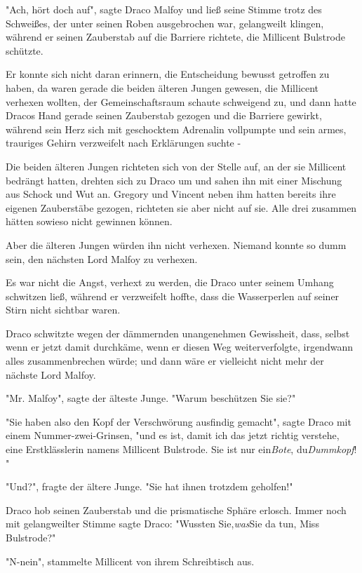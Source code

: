 {"Ach, hört doch auf", sagte Draco Malfoy und ließ seine Stimme trotz des Schweißes, der unter seinen Roben ausgebrochen war, gelangweilt klingen, während er seinen Zauberstab auf die Barriere richtete, die Millicent Bulstrode schützte.

Er konnte sich nicht daran erinnern, die Entscheidung bewusst getroffen zu haben, da waren gerade die beiden älteren Jungen gewesen, die Millicent verhexen wollten, der Gemeinschaftsraum schaute schweigend zu, und dann hatte Dracos Hand gerade seinen Zauberstab gezogen und die Barriere gewirkt, während sein Herz sich mit geschocktem Adrenalin vollpumpte und sein armes, trauriges Gehirn verzweifelt nach Erklärungen suchte -

Die beiden älteren Jungen richteten sich von der Stelle auf, an der sie Millicent bedrängt hatten, drehten sich zu Draco um und sahen ihn mit einer Mischung aus Schock und Wut an. Gregory und Vincent neben ihm hatten bereits ihre eigenen Zauberstäbe gezogen, richteten sie aber nicht auf sie. Alle drei zusammen hätten sowieso nicht gewinnen können.

Aber die älteren Jungen würden ihn nicht verhexen. Niemand konnte so dumm sein, den nächsten Lord Malfoy zu verhexen.

Es war nicht die Angst, verhext zu werden, die Draco unter seinem Umhang schwitzen ließ, während er verzweifelt hoffte, dass die Wasserperlen auf seiner Stirn nicht sichtbar waren.

Draco schwitzte wegen der dämmernden unangenehmen Gewissheit, dass, selbst wenn er jetzt damit durchkäme, wenn er diesen Weg weiterverfolgte, irgendwann alles zusammenbrechen würde; und dann wäre er vielleicht nicht mehr der nächste Lord Malfoy.

"Mr. Malfoy", sagte der älteste Junge. "Warum beschützen Sie sie?"

"Sie haben also den Kopf der Verschwörung ausfindig gemacht", sagte Draco mit einem Nummer-zwei-Grinsen, "und es ist, damit ich das jetzt richtig verstehe, eine Erstklässlerin namens Millicent Bulstrode. Sie ist nur ein\emph{Bote}, du\emph{Dummkopf}! "

"Und?", fragte der ältere Junge. "Sie hat ihnen trotzdem geholfen!"

Draco hob seinen Zauberstab und die prismatische Sphäre erlosch. Immer noch mit gelangweilter Stimme sagte Draco: "Wussten Sie,\emph{was}Sie da tun, Miss Bulstrode?"

"N-nein", stammelte Millicent von ihrem Schreibtisch aus.

}
